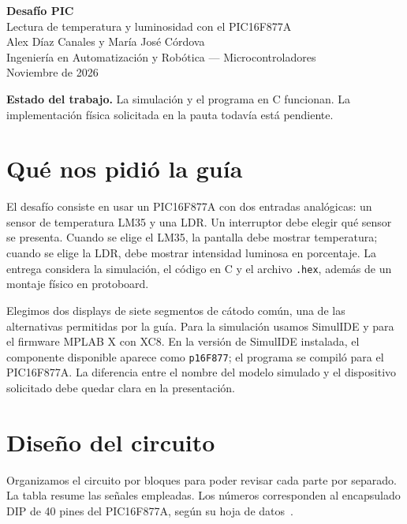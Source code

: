 \documentclass[11pt,a4paper]{article}
\begin{document}
\begin{center}
  {\Large\bfseries\color{azul} Desafío PIC}\\[0.25cm]
  {\large Lectura de temperatura y luminosidad con el PIC16F877A}\\[0.45cm]
  {\normalsize Alex Díaz Canales y María José Córdova}\\[0.15cm]
  {\normalsize Ingeniería en Automatización y Robótica --- Microcontroladores}\\[0.15cm]
  {\normalsize Noviembre de 2026}
\end{center}

\noindent\colorbox{verde}{\parbox{\dimexpr\linewidth-2\fboxsep\relax}{\textbf{Estado del trabajo.}
La simulación y el programa en C funcionan. La implementación física solicitada en la pauta todavía está pendiente.}}

\section{Qué nos pidió la guía}

El desafío consiste en usar un PIC16F877A con dos entradas analógicas: un sensor de temperatura LM35 y una LDR. Un interruptor debe elegir qué sensor se presenta. Cuando se elige el LM35, la pantalla debe mostrar temperatura; cuando se elige la LDR, debe mostrar intensidad luminosa en porcentaje. La entrega considera la simulación, el código en C y el archivo \texttt{.hex}, además de un montaje físico en protoboard.

Elegimos dos displays de siete segmentos de cátodo común, una de las alternativas permitidas por la guía. Para la simulación usamos SimulIDE y para el firmware MPLAB X con XC8. En la versión de SimulIDE instalada, el componente disponible aparece como \texttt{p16F877}; el programa se compiló para el PIC16F877A. La diferencia entre el nombre del modelo simulado y el dispositivo solicitado debe quedar clara en la presentación.

\section{Diseño del circuito}

Organizamos el circuito por bloques para poder revisar cada parte por separado. La tabla resume las señales empleadas. Los números corresponden al encapsulado DIP de 40 pines del PIC16F877A, según su hoja de datos~\cite{pic}.
\end{document}
